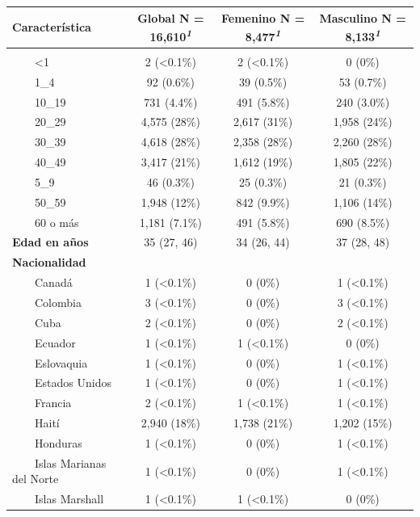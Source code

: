 \documentclass[
  letterpaper,
  DIV=11,
  numbers=noendperiod]{scrreprt}
\begin{document}
\begin{table}
\fontsize{12.0pt}{14.4pt}\selectfont
\begin{tabular*}{\linewidth}{@{\extracolsep{\fill}}lccc}
\toprule
\textbf{Característica} & \textbf{Global}  N = 16,610\textsuperscript{\textit{1}} & \textbf{Femenino}  N = 8,477\textsuperscript{\textit{1}} & \textbf{Masculino}  N = 8,133\textsuperscript{\textit{1}} \\ 
\midrule\addlinespace[2.5pt]
{\bfseries Grupo de edad en años} &  &  &  \\ 
    <1 & 2 (<0.1\%) & 2 (<0.1\%) & 0 (0\%) \\ 
    1\_4 & 92 (0.6\%) & 39 (0.5\%) & 53 (0.7\%) \\ 
    10\_19 & 731 (4.4\%) & 491 (5.8\%) & 240 (3.0\%) \\ 
    20\_29 & 4,575 (28\%) & 2,617 (31\%) & 1,958 (24\%) \\ 
    30\_39 & 4,618 (28\%) & 2,358 (28\%) & 2,260 (28\%) \\ 
    40\_49 & 3,417 (21\%) & 1,612 (19\%) & 1,805 (22\%) \\ 
    5\_9 & 46 (0.3\%) & 25 (0.3\%) & 21 (0.3\%) \\ 
    50\_59 & 1,948 (12\%) & 842 (9.9\%) & 1,106 (14\%) \\ 
    60 o más & 1,181 (7.1\%) & 491 (5.8\%) & 690 (8.5\%) \\ 
{\bfseries Edad en años} & 35 (27, 46) & 34 (26, 44) & 37 (28, 48) \\ 
{\bfseries Nacionalidad} &  &  &  \\ 
    Canadá & 1 (<0.1\%) & 0 (0\%) & 1 (<0.1\%) \\ 
    Colombia & 3 (<0.1\%) & 0 (0\%) & 3 (<0.1\%) \\ 
    Cuba & 2 (<0.1\%) & 0 (0\%) & 2 (<0.1\%) \\ 
    Ecuador & 1 (<0.1\%) & 1 (<0.1\%) & 0 (0\%) \\ 
    Eslovaquia & 1 (<0.1\%) & 0 (0\%) & 1 (<0.1\%) \\ 
    Estados Unidos & 1 (<0.1\%) & 0 (0\%) & 1 (<0.1\%) \\ 
    Francia & 2 (<0.1\%) & 1 (<0.1\%) & 1 (<0.1\%) \\ 
    Haití & 2,940 (18\%) & 1,738 (21\%) & 1,202 (15\%) \\ 
    Honduras & 1 (<0.1\%) & 0 (0\%) & 1 (<0.1\%) \\ 
    Islas Marianas del Norte & 1 (<0.1\%) & 0 (0\%) & 1 (<0.1\%) \\ 
    Islas Marshall & 1 (<0.1\%) & 1 (<0.1\%) & 0 (0\%) \\ 

\end{tabular*}
\end{table}
\end{document}
